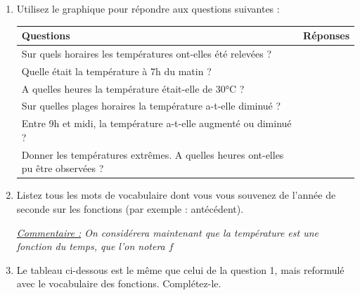 \documentclass[10pt,a4paper]{article}
\begin{document}
\begin{enumerate}

    \item Utilisez le graphique pour répondre aux questions suivantes :
    \renewcommand{\arraystretch}{2} %
    \begin{center}
    \begin{tabular}{|p{5cm}|p{10cm}|}
    \hline
    Questions & Réponses \\
    \hline
    \hline
    Sur quels horaires les températures ont-elles été relevées ? & \\
    \hline
    Quelle était la température à 7h du matin ? &    \\
    \hline
    A quelles heures la température était-elle de 30°C ? &  \\
    \hline
    Sur quelles plages horaires la température a-t-elle diminué ? & \\ 
    \hline
    Entre 9h et midi, la température a-t-elle augmenté ou diminué ?& \\ 
    \hline
    Donner les températures extrêmes. A quelles heures ont-elles pu être observées ?  & \\
    \hline
    \end{tabular}
    \end{center}


    \item Listez tous les mots de vocabulaire dont vous vous souvenez de l'année de seconde sur les fonctions (par exemple : antécédent). 

    \medskip

    \textit{\underline{Commentaire :} On considérera maintenant que la température est une fonction du temps, que l'on notera \(f\)}

    \medskip


    \item Le tableau ci-dessous est le même que celui de la question 1, mais reformulé avec le vocabulaire des fonctions. Complétez-le.
    



\end{enumerate}
\end{document}

